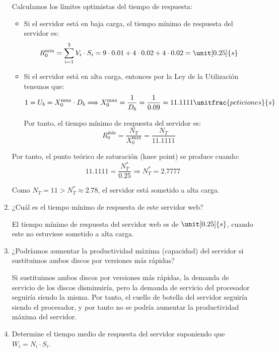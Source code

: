 \begin{ejercicio}
\begin{enumerate}
        Calculamos los límites optimistas del tiempo de respuesta:
        \begin{itemize}
            \item Si el servidor está en baja carga, el tiempo mínimo de respuesta del servidor es:
            \begin{equation*}
                R_0^{\text{min}} = \sum_{i=1}^{3} V_i \cdot S_i = 9 \cdot 0.01 + 4 \cdot 0.02 + 4 \cdot 0.02 = \unit[0.25]{s}
            \end{equation*}
            \item Si el servidor está en alta carga, entonces por la Ley de la Utilización tenemos que:
            \begin{equation*}
                1 = U_b = X_0^{\text{max}} \cdot D_b
                \Longrightarrow X_0^{\text{max}} = \dfrac{1}{D_b} = \dfrac{1}{0.09} = 11.1111 \unitfrac{peticiones}{s}
            \end{equation*}

            Por tanto, el tiempo mínimo de respuesta del servidor es:
            \begin{equation*}
                R_0^{\text{min}} = \dfrac{N_T}{X_0^{\text{max}}} = \dfrac{N_T}{11.1111}
            \end{equation*}
        \end{itemize}

        Por tanto, el punto teórico de saturación (knee point) se produce cuando:
        \begin{equation*}
            11.1111 = \dfrac{N_T^*}{0.25}
            \Longrightarrow N_T^* = 2.7777
        \end{equation*}

        Como $N_T = 11 > N_T^* \approx 2.78$, el servidor está sometido a alta carga.
        \item ¿Cuál es el tiempo mínimo de respuesta de este servidor web?
        
        El tiempo mínimo de respuesta del servidor web es de $\unit[0.25]{s}$, cuando este no estuviese sometido a alta carga.
        \item ¿Podríamos aumentar la productividad máxima (capacidad) del servidor si sustituimos ambos discos por versiones más rápidas?
        
        Si sustituimos ambos discos por versiones más rápidas, la demanda de servicio de los discos disminuiría, pero la demanda de servicio del procesador seguiría siendo la misma. Por tanto, el cuello de botella del servidor seguiría siendo el procesador, y por tanto no se podría aumentar la productividad máxima del servidor.
        \item Determine el tiempo medio de respuesta del servidor suponiendo que $W_i = N_i \cdot S_i$.
        

\end{enumerate}
\end{ejercicio}
